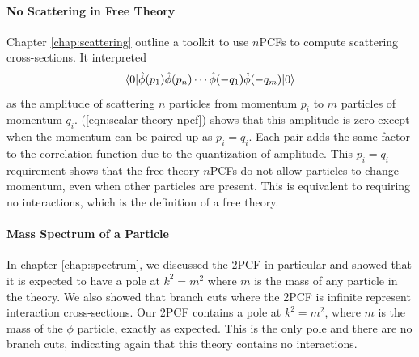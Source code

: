 \paragraph*{No Scattering in Free Theory}
Chapter \ref{chap:scattering} outline a toolkit to use $n$PCFs to compute scattering cross-sections. It interpreted 
$$\braket{0|\hat\phi(p_1)\hat\phi(p_n)\cdots\hat\phi(-q_1)\hat\phi(-q_m)|0}$$
as the amplitude of scattering $n$ particles from momentum $p_i$ to $m$ particles of momentum $q_i$. (\ref{eqn:scalar-theory-npcf}) shows that this amplitude is zero except when the momentum can be paired up as $p_i = q_i$. Each pair adds the same factor to the correlation function due to the quantization of amplitude. This $p_i = q_i$ requirement shows that the free theory $n$PCFs do not allow particles to change momentum, even when other particles are present. This is equivalent to requiring no interactions, which is the definition of a free theory.

\paragraph*{Mass Spectrum of a Particle}
In chapter \ref{chap:spectrum}, we discussed the 2PCF in particular and showed that it is expected to have a pole at $k^2 = m^2$ where $m$ is the mass of any particle in the theory. We also showed that branch cuts where the 2PCF is infinite represent interaction cross-sections. Our 2PCF contains a pole at $k^2 = m^2$, where $m$ is the mass of the $\phi$ particle, exactly as expected. This is the only pole and there are no branch cuts, indicating again that this theory contains no interactions.

